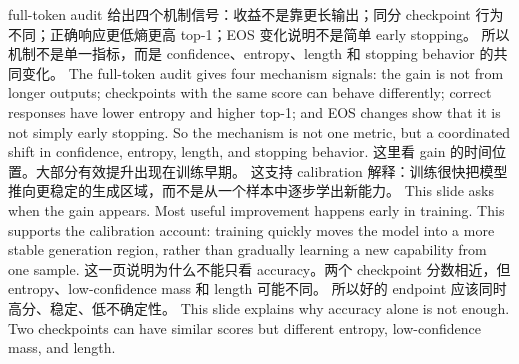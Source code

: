 {}\markdownRendererHorizontalRule{}\markdownRendererInterblockSeparator
{}\markdownRendererInterblockSeparator
{}\markdownRendererInterblockSeparator
{}full-token audit 给出四个机制信号：收益不是靠更长输出；同分 checkpoint 行为不同；正确响应更低熵更高 top-1；EOS 变化说明不是简单 early stopping。\markdownRendererInterblockSeparator
{}所以机制不是单一指标，而是 confidence、entropy、length 和 stopping behavior 的共同变化。\markdownRendererInterblockSeparator
{}\markdownRendererInterblockSeparator
{}The full-token audit gives four mechanism signals: the gain is not from longer outputs; checkpoints with the same score can behave differently; correct responses have lower entropy and higher top-1; and EOS changes show that it is not simply early stopping.\markdownRendererInterblockSeparator
{}So the mechanism is not one metric, but a coordinated shift in confidence, entropy, length, and stopping behavior.\markdownRendererInterblockSeparator
{}\markdownRendererHorizontalRule{}\markdownRendererInterblockSeparator
{}\markdownRendererInterblockSeparator
{}\markdownRendererInterblockSeparator
{}这里看 gain 的时间位置。大部分有效提升出现在训练早期。\markdownRendererInterblockSeparator
{}这支持 calibration 解释：训练很快把模型推向更稳定的生成区域，而不是从一个样本中逐步学出新能力。\markdownRendererInterblockSeparator
{}\markdownRendererInterblockSeparator
{}This slide asks when the gain appears. Most useful improvement happens early in training.\markdownRendererInterblockSeparator
{}This supports the calibration account: training quickly moves the model into a more stable generation region, rather than gradually learning a new capability from one sample.\markdownRendererInterblockSeparator
{}\markdownRendererHorizontalRule{}\markdownRendererInterblockSeparator
{}\markdownRendererInterblockSeparator
{}\markdownRendererInterblockSeparator
{}这一页说明为什么不能只看 accuracy。两个 checkpoint 分数相近，但 entropy、low-confidence mass 和 length 可能不同。\markdownRendererInterblockSeparator
{}所以好的 endpoint 应该同时高分、稳定、低不确定性。\markdownRendererInterblockSeparator
{}\markdownRendererInterblockSeparator
{}This slide explains why accuracy alone is not enough. Two checkpoints can have similar scores but different entropy, low-confidence mass, and length.\markdownRendererInterblockSeparator
